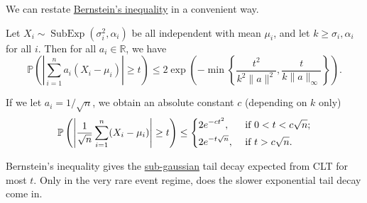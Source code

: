 We can restate \hyperref[thm:Bernstein-inequality]{Bernstein's inequality} in a convenient way.

\begin{corollary}\label{col:Bernstein-inequality}
	Let \(X_i \sim \mathop{\mathrm{SubExp}}(\sigma _i^{2} , \alpha _i) \) be all independent with mean \(\mu _i\), and let \(k \geq \sigma _i, \alpha _i\) for all \(i\). Then for all \(a_i\in \mathbb{R} \), we have
	\[
		\mathbb{P} \left( \left\vert  \sum_{i=1}^{n} a_i(X_i - \mu _i) \right\vert  \geq t \right) \leq 2 \exp \left( - \min \left\{ \frac{t^{2} }{k^2 \lVert a \rVert ^2}, \frac{t}{k \lVert a \rVert _\infty } \right\} \right) .
	\]
\end{corollary}

\begin{note}
	If we let \(a_i = 1 / \sqrt{n} \), we obtain an absolute constant \(c\) (depending on \(k\) only)
	\[
		\mathbb{P} \left( \left\vert \frac{1}{\sqrt{n} } \sum_{i=1}^{n} (X_i - \mu _i) \right\vert \geq t \right) \leq
		\begin{dcases}
			2e^{-ct^{2} },    & \text{ if } 0 < t < c\sqrt{n}  ; \\
			2e^{-t\sqrt{n} }, & \text{ if } t > c\sqrt{n} .
		\end{dcases}
	\]
\end{note}

\begin{remark}
	Bernstein's inequality gives the \hyperref[def:sub-gaussian]{sub-gaussian} tail decay expected from CLT for most \(t\). Only in the very rare event regime, does the slower exponential tail decay come in.
\end{remark}
